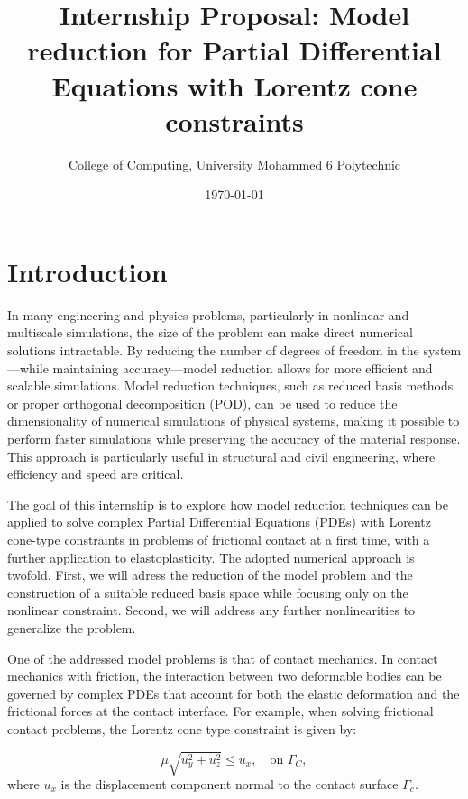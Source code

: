 \documentclass[12pt]{article}
\title{Internship Proposal: Model reduction for Partial Differential Equations with Lorentz cone constraints }
\author{
	College of Computing, University Mohammed 6 Polytechnic \\
}
\date{\today}
\begin{document}
	
	\maketitle
	
	\section{Introduction}
	In many engineering and physics problems, particularly in nonlinear and multiscale simulations, the size of the problem can make direct numerical solutions intractable. By reducing the number of degrees of freedom in the system—while maintaining accuracy—model reduction allows for more efficient and scalable simulations. 
	Model reduction techniques, such as reduced basis methods or proper orthogonal decomposition (POD), can be used to reduce the dimensionality of numerical simulations of physical systems, making it possible to perform faster simulations while preserving the accuracy of the material response. This approach is particularly useful in structural and civil engineering, where efficiency and speed are critical.
	
	The goal of this internship is to explore how model reduction techniques can be applied to solve complex Partial Differential Equations (PDEs) with Lorentz cone-type constraints in problems of frictional contact at a first time, with a further application to elastoplasticity. 
	The adopted numerical approach is twofold. First, we will adress the reduction of the model problem and the construction of a suitable reduced basis space while focusing only on the nonlinear constraint. 
	Second, we will address any further nonlinearities to generalize the problem.
	
	One of the addressed model problems is that of contact mechanics. In contact mechanics with friction, the interaction between two deformable bodies can be governed by complex PDEs that account for both the elastic deformation and the frictional forces at the contact interface. 
	For example, when solving frictional contact problems, the Lorentz cone type constraint is given by:
	
	\begin{equation}
		\mu\sqrt{u_y^2+u_z^2}\leq u_x, \quad \text{on } \Gamma_C,
	\end{equation}
	where $u_x$ is the displacement component normal to the contact surface $\Gamma_c$.
	
	
\end{document}
